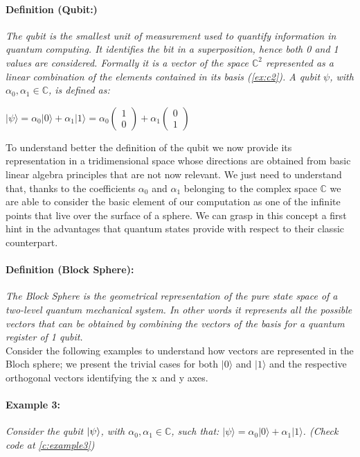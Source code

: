 \documentclass[english]{article}
\newcommand{\zeroket}{\begin{pmatrix} 1 \\ 0 \end{pmatrix}}
\newcommand{\oneket}{\begin{pmatrix} 0 \\ 1 \end{pmatrix}}
\begin{document}
				\paragraph{Definition (Qubit:)} \emph{The qubit is the smallest unit of measurement used to quantify information in quantum computing. It identifies the bit in a superposition, hence both 0 and 1 values are considered. Formally it is a vector of the space $\mathbb{C}^{2}$ represented as a linear combination of the elements contained in its basis (\ref{ex:c2}). A qubit $\psi$, with $\alpha_0,\alpha_1\in\mathbb{C}$, is defined as:}\\
				\begin{center}
					$
					|\psi\rangle = \alpha_0 |0\rangle + \alpha_1 |1\rangle = \alpha_0\zeroket + \alpha_1\oneket
					$
				\end{center}
				
				To understand better the definition of the qubit we now provide its representation in a tridimensional space whose directions are obtained from basic linear algebra principles that are not now relevant. We just need to understand that, thanks to the coefficients $\alpha_0$ and $\alpha_1$ belonging to the complex space $\mathbb{C}$ we are able to consider the basic element of our computation as one of the infinite points that live over the surface of a sphere. We can grasp in this concept a first hint in the advantages that quantum states provide with respect to their classic counterpart.
				
				\paragraph{Definition (Block Sphere):} \emph{The Block Sphere is the geometrical representation of the pure state space of a two-level quantum mechanical system. In other words it represents all the possible vectors that can be obtained by combining the vectors of the basis for a quantum register of 1 qubit.}\\
				
				Consider the following examples to understand how vectors are represented in the Bloch sphere; we present the trivial cases for both $|0\rangle$ and $|1\rangle$ and the respective orthogonal vectors identifying the x and y axes.
	
				\paragraph{Example 3:} \emph{Consider the qubit $\left\vert{\psi}\right\rangle$, with $\alpha_0,\alpha_1\in\mathbb{C}$, such that: 	$|\psi\rangle = \alpha_0 |0\rangle + \alpha_1 |1\rangle$. (Check code at \ref{c:example3})}
				
\end{document}

